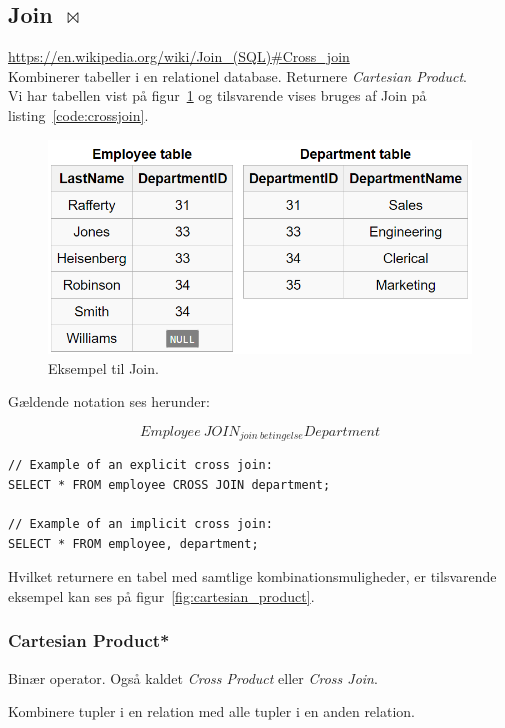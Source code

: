 \subsection{Join $\Join$}

\url{https://en.wikipedia.org/wiki/Join_(SQL)#Cross_join}\\

Kombinerer tabeller i en relationel database. Returnere \textit{Cartesian Product}.\\
Vi har tabellen vist på figur~\ref{fig:employee_dept} og tilsvarende vises bruges af Join på listing~\ref{code:crossjoin}.

\begin{figure}[H]
\centering
\includegraphics[width=0.6\linewidth]{figs/spm6/employee_dept}
\caption{Eksempel til Join.}
\label{fig:employee_dept}
\end{figure}

Gældende notation ses herunder:

\begin{equation*}
Employee~JOIN_{join~betingelse} Department
\end{equation*}

\begin{lstlisting}[caption=SQL for Cross Join,label=code:crossjoin,morekeywords={SELECT, FROM, WHERE, CROSS, JOIN}]
// Example of an explicit cross join:
SELECT * FROM employee CROSS JOIN department;

// Example of an implicit cross join:
SELECT * FROM employee, department;
\end{lstlisting}

Hvilket returnere en tabel med samtlige kombinationsmuligheder, er tilsvarende eksempel kan ses på figur~\ref{fig:cartesian_product}.

\subsubsection{Cartesian Product*}
Binær operator. Også kaldet \textit{Cross Product} eller \textit{Cross Join}. 

Kombinere tupler i en relation med alle tupler i en anden relation.\\

